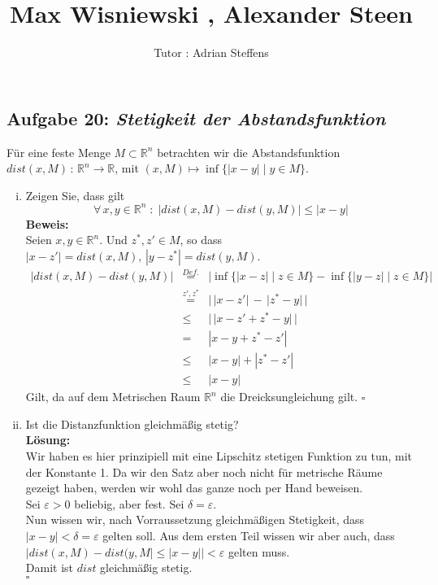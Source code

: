 \documentclass[11pt,a4paper,ngerman]{article}
\date{}
\title{Max Wisniewski , Alexander Steen}
\author{Tutor : Adrian Steffens}
\begin{document}

\maketitle
\thispagestyle{fancy}

\subsection*{Aufgabe 20: \mdseries\itshape Stetigkeit der Abstandsfunktion}
Für eine feste Menge $M \subset \mathbb{R}^n$ betrachten wir die  Abstandsfunktion $dist(x,M) \, : \, \mathbb{R}^n \rightarrow \mathbb{R}$, mit
$(x,M) \mapsto \inf \{ |x - y | \; | \; y \in M \}$.

\begin{enumerate}[(i)]
	\item Zeigen Sie, dass gilt
	$$
		\forall \, x,y \in \mathbb{R}^n \; : \; \left| dist(x,M) - dist(y,M) \right| \leq |x - y| 
	$$
	\textbf{Beweis:}\\
		Seien $x,y \in \mathbb{R}^n$. Und $z^*,z' \in M$, so dass $|x-z'| = dist(x,M), \, |y-z^*| = dist(y,M)$.
			$$\begin{array}{rcl}
				| dist(x,M) - dist(y,M) | & \stackrel{Def.}{=} & | \inf \{ |x - z| \; | \; z \in M\} - \inf \{ | y - z | \; | \; z \in M \} |\\
					&\stackrel{z',z^*}{=}& | \, | x - z'| \, - \, | z^* - y| \, |\\
					&\leq& |\, | x - z' + z^* - y| \, |\\
					&=& | x -y + z^* - z'|\\
					&\leq& |x - y| + |z^* - z'|\\
					&\leq& |x - y|
			\end{array}$$
		Gilt, da auf dem Metrischen Raum $\mathbb{R}^n$ die Dreicksungleichung gilt.
		\mbox{} \hfill $\square$

	\item Ist die Distanzfunktion gleichmäßig stetig?\\
	\textbf{Lösung:}\\
		Wir haben es hier prinzipiell mit eine Lipschitz stetigen Funktion zu tun, mit der Konstante 1. Da wir den Satz aber noch nicht
		für metrische Räume gezeigt haben, werden wir wohl das ganze noch per Hand beweisen.\\

		Sei $\varepsilon > 0$ beliebig, aber fest. Sei $\delta = \varepsilon$.\\
		Nun wissen wir, nach Vorraussetzung gleichmäßigen Stetigkeit, dass $|x - y| < \delta = \varepsilon$ gelten soll.
		Aus dem ersten Teil wissen wir aber auch, dass $| dist(x,M) - dist(y,M | \leq |x -y|| < \varepsilon$ gelten muss.\\

		Damit ist $dist$ gleichmäßig stetig.\\
		\mbox{} \hfill $\square$
\end{enumerate}
\end{document}
